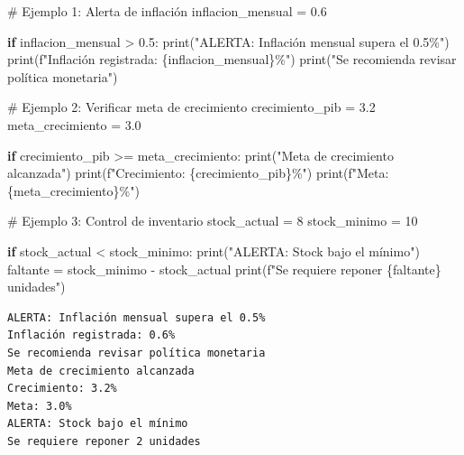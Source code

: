 \documentclass[
  doc,
  floatsintext,
  longtable,
  a4paper,
  nolmodern,
  notxfonts,
  notimes,
  12pt,
  colorlinks=true,linkcolor=blue,citecolor=blue,urlcolor=blue]{apa7}
\newenvironment{Shaded}{\begin{snugshade}}{\end{snugshade}}
\newcommand{\BuiltInTok}[1]{\textcolor[rgb]{0.00,0.23,0.31}{#1}}
\newcommand{\CommentTok}[1]{\textcolor[rgb]{0.37,0.37,0.37}{#1}}
\newcommand{\ControlFlowTok}[1]{\textcolor[rgb]{0.00,0.23,0.31}{\textbf{#1}}}
\newcommand{\DecValTok}[1]{\textcolor[rgb]{0.68,0.00,0.00}{#1}}
\newcommand{\FloatTok}[1]{\textcolor[rgb]{0.68,0.00,0.00}{#1}}
\newcommand{\NormalTok}[1]{\textcolor[rgb]{0.00,0.23,0.31}{#1}}
\newcommand{\OperatorTok}[1]{\textcolor[rgb]{0.37,0.37,0.37}{#1}}
\newcommand{\SpecialCharTok}[1]{\textcolor[rgb]{0.37,0.37,0.37}{#1}}
\newcommand{\SpecialStringTok}[1]{\textcolor[rgb]{0.13,0.47,0.30}{#1}}
\newcommand{\StringTok}[1]{\textcolor[rgb]{0.13,0.47,0.30}{#1}}
\begin{document}
\begin{Shaded}
\begin{Highlighting}[]
\CommentTok{\# Ejemplo 1: Alerta de inflación}
\NormalTok{inflacion\_mensual }\OperatorTok{=} \FloatTok{0.6}

\ControlFlowTok{if}\NormalTok{ inflacion\_mensual }\OperatorTok{\textgreater{}} \FloatTok{0.5}\NormalTok{:}
    \BuiltInTok{print}\NormalTok{(}\StringTok{"ALERTA: Inflación mensual supera el 0.5\%"}\NormalTok{)}
    \BuiltInTok{print}\NormalTok{(}\SpecialStringTok{f"Inflación registrada: }\SpecialCharTok{\{}\NormalTok{inflacion\_mensual}\SpecialCharTok{\}}\SpecialStringTok{\%"}\NormalTok{)}
    \BuiltInTok{print}\NormalTok{(}\StringTok{"Se recomienda revisar política monetaria"}\NormalTok{)}

\CommentTok{\# Ejemplo 2: Verificar meta de crecimiento}
\NormalTok{crecimiento\_pib }\OperatorTok{=} \FloatTok{3.2}
\NormalTok{meta\_crecimiento }\OperatorTok{=} \FloatTok{3.0}

\ControlFlowTok{if}\NormalTok{ crecimiento\_pib }\OperatorTok{\textgreater{}=}\NormalTok{ meta\_crecimiento:}
    \BuiltInTok{print}\NormalTok{(}\StringTok{"Meta de crecimiento alcanzada"}\NormalTok{)}
    \BuiltInTok{print}\NormalTok{(}\SpecialStringTok{f"Crecimiento: }\SpecialCharTok{\{}\NormalTok{crecimiento\_pib}\SpecialCharTok{\}}\SpecialStringTok{\%"}\NormalTok{)}
    \BuiltInTok{print}\NormalTok{(}\SpecialStringTok{f"Meta: }\SpecialCharTok{\{}\NormalTok{meta\_crecimiento}\SpecialCharTok{\}}\SpecialStringTok{\%"}\NormalTok{)}

\CommentTok{\# Ejemplo 3: Control de inventario}
\NormalTok{stock\_actual }\OperatorTok{=} \DecValTok{8}
\NormalTok{stock\_minimo }\OperatorTok{=} \DecValTok{10}

\ControlFlowTok{if}\NormalTok{ stock\_actual }\OperatorTok{\textless{}}\NormalTok{ stock\_minimo:}
    \BuiltInTok{print}\NormalTok{(}\StringTok{"ALERTA: Stock bajo el mínimo"}\NormalTok{)}
\NormalTok{    faltante }\OperatorTok{=}\NormalTok{ stock\_minimo }\OperatorTok{{-}}\NormalTok{ stock\_actual}
    \BuiltInTok{print}\NormalTok{(}\SpecialStringTok{f"Se requiere reponer }\SpecialCharTok{\{}\NormalTok{faltante}\SpecialCharTok{\}}\SpecialStringTok{ unidades"}\NormalTok{)}
\end{Highlighting}
\end{Shaded}

\begin{verbatim}
ALERTA: Inflación mensual supera el 0.5%
Inflación registrada: 0.6%
Se recomienda revisar política monetaria
Meta de crecimiento alcanzada
Crecimiento: 3.2%
Meta: 3.0%
ALERTA: Stock bajo el mínimo
Se requiere reponer 2 unidades
\end{verbatim}
\end{document}
